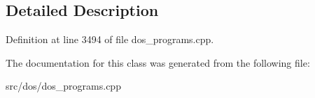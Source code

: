 \subsection{Detailed Description}


Definition at line 3494 of file dos\-\_\-programs.\-cpp.



The documentation for this class was generated from the following file\-:\begin{DoxyCompactItemize}
\item 
src/dos/dos\-\_\-programs.\-cpp\end{DoxyCompactItemize}
